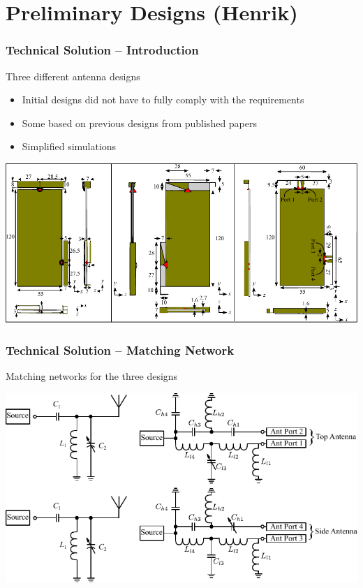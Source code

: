 \section[Preliminary Designs]{Preliminary Designs (Henrik)}
\begin{frame}
    \frametitle{Technical Solution -- Introduction}
    \begin{block}{Three different antenna designs}
      \begin{itemize}
      \item Initial designs did not have to fully comply with the requirements
      \item Some based on previous designs from published papers
      \item Simplified simulations
      \end{itemize}
    \end{block}
\vspace*{-0.5cm}
  \begin{center} 
    \includegraphics[width=\textwidth]{img/henrik/all_td}%

  \end{center}
\end{frame}

\begin{frame}
    \frametitle{Technical Solution -- Matching Network}
    \begin{block}{Matching networks for the three designs}
  \begin{center} 
    \includegraphics[width=\textwidth]{img/henrik/schematic_tuning}%
  \end{center}
\end{block}
\end{frame}


